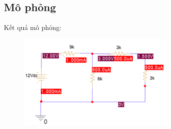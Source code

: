 \subsection{Mô phỏng}
Kết quả mô phỏng:
\begin{figure}[!htbp]
    \centering
    \includegraphics[width=0.7\textwidth]{graphics/ex4/f2.png}
\end{figure}

